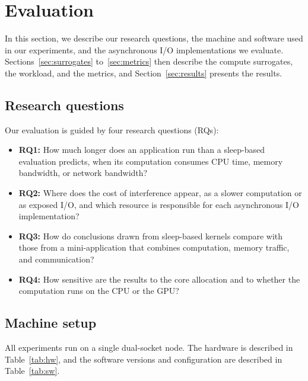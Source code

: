 \section{Evaluation}
\label{sec:eval}


In this section, we describe our research questions, the machine and
software used in our experiments, and the asynchronous I/O implementations
we evaluate. Sections~\ref{sec:surrogates} to~\ref{sec:metrics} then
describe the compute surrogates, the workload, and the metrics, and
Section~\ref{sec:results} presents the results.

\subsection{Research questions}
Our evaluation is guided by four research questions (RQs):
\begin{itemize}
  \item \textbf{RQ1:} How much longer does an application run than a
        sleep-based evaluation predicts, when its computation consumes CPU
        time, memory bandwidth, or network bandwidth?
  \item \textbf{RQ2:} Where does the cost of interference appear, as a
        slower computation or as exposed I/O, and which resource is
        responsible for each asynchronous I/O implementation?
  \item \textbf{RQ3:} How do conclusions drawn from sleep-based kernels
        compare with those from a mini-application that combines
        computation, memory traffic, and communication?
  \item \textbf{RQ4:} How sensitive are the results to the core allocation
        and to whether the computation runs on the CPU or the GPU?
\end{itemize}

\subsection{Machine setup}
\label{sec:machine}
All experiments run on a single dual-socket node. The hardware is described
in Table~\ref{tab:hw}, and the software versions and configuration are
described in Table~\ref{tab:sw}.

